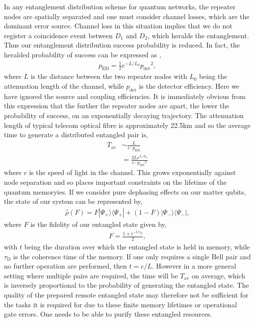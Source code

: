 \documentclass[twocolumn, aps, rmp, amsmath, amssymb, nofootinbib, superscriptaddress, longbibliography, floatfix, table-of-contents, eqsecnum]{revtex4-1}
\begin{document}
In any entanglement distribution scheme for quantum networks, the repeater nodes are spatially separated and one must consider channel losses, which are the dominant error source. Channel loss in this situation implies that we do not register a coincidence event between $D_1$ and $D_2$, which heralds the entanglement. Thus our entanglement distribution success probability is reduced. In fact, the heralded probability of success can be expressed as \cite{},
\begin{align}
p_\mathrm{ED}= \frac{1}{2} e^{-L/L_0} {p_\mathrm{det}}^2,
\end{align} 
where $L$ is the distance between the two repeater nodes with $L_0$ being the attenuation length of the channel, while $p_\mathrm{det}$ is the detector efficiency. Here we have ignored the source and coupling efficiencies. It is immediately obvious from this expression that the further the repeater nodes are apart, the lower the probability of success, on an exponentially decaying trajectory. The attenuation length of typical telecom optical fibre is approximately 22.5km and so the average time to generate a distributed entangled pair is,
\begin{align}
T_\mathrm{av} &\sim \frac{L}{ c \cdot p_\mathrm{ED}}\nonumber\\
&= \frac{2 L e^{L/L_0}}{ c \cdot {p_\mathrm{det}}^2}
\end{align} 
where $c$ is the speed of light in the channel. This grows exponentially against node separation and so places important constraints on the lifetime of the quantum memoryies. If we consider pure dephasing effects on our matter qubits, the state of our system can be represented by,
\begin{align}
\hat\rho(F) = F |\Psi_+\rangle \langle \Psi_+|+(1-F) |\Psi_-\rangle \langle \Psi_-|,
\label{eq:rho_bell_fid}
\end{align} 
where $F$ is the fidelity of our entangled state given by,
\begin{align}
F=\frac{1+e^{-t/\tau_\mathrm{D}}}{2},
\end{align} 
with $t$ being the duration over which the entangled state is held in memory, while $\tau_\mathrm{D}$ is the coherence time of the memory. If one only requires a single Bell pair and no further operation are performed, then \mbox{$t=c/L$}. However in a more general setting where multiple pairs are required, the time will be $T_\mathrm{av}$ on average, which is inversely proportional to the probability of generating the entangled state. The quality of the prepared remote entangled state may therefore not be sufficient for the tasks it is required for due to these finite memory lifetimes or operational gate errors. One needs to be able to purify these entangled resources. 
\end{document}
